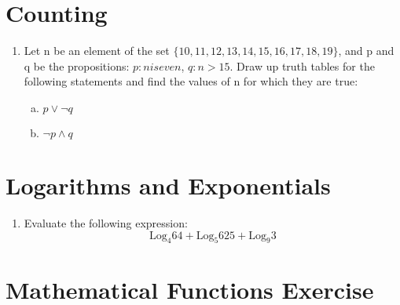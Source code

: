 \documentclass[]{article}
\begin{document}
\section*{Counting}



\begin{enumerate}
\item
Let n be an element of the set $\{10, 11, 12, 13, 14, 15, 16, 17, 18, 19\}$,
and p and q be the propositions:
$p : n is even$, $q : n > 15$.
Draw up truth tables for the following statements and find the values of n for
which they are true:

\begin{enumerate}[(a)]
\item $p \vee \neg q$
\item $\neg p \wedge q$
\end{enumerate}
\end{enumerate}
\section*{Logarithms and Exponentials}
\begin{enumerate}
    \item Evaluate the following expression:
\[ \mbox{Log}_4 64 + \mbox{Log}_5 625 + \mbox{Log}_9 3 \] 
\end{enumerate}


\section*{Mathematical Functions Exercise}
\end{document}
